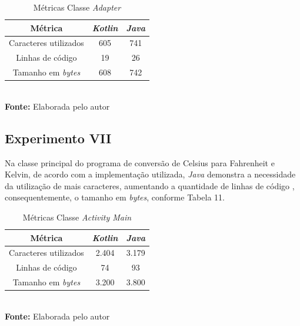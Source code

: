 \FloatBarrier
\begin{table}[!htbp]
\centering
\caption{Métricas Classe \textit{Adapter}}
	\begin{tabular}{ c | c | c }
		\hline
            \textbf{Métrica} &         \textbf{\textit{Kotlin}}    & \textbf{\textit{Java}}  \\ \hline
		
		  Caracteres utilizados   &     605 	      &          741      \\ \hline
		             
		  Linhas de código        &     19            &           26      \\ \hline
		             
		  Tamanho em \textit{bytes}        &     608           &          742      \\ \hline
		  
	\end{tabular}
	\\ \vspace{0.2cm}
	\textbf{Fonte:} Elaborada pelo autor
	\label{tab:exemplo}
\end{table}
\FloatBarrier

\subsection{Experimento VII}

Na classe principal do programa de conversão de Celsius para Fahrenheit e Kelvin, de acordo com a implementação utilizada, \textit{Java} demonstra a necessidade da utilização de mais caracteres, aumentando a quantidade de linhas de código , consequentemente, o tamanho em \textit{bytes}, conforme Tabela 11.

\FloatBarrier
\begin{table}[!htbp]
\centering
\caption{Métricas Classe \textit{Activity Main}}
	\begin{tabular}{ c | c | c }
		\hline
            \textbf{Métrica} &        \textbf{\textit{Kotlin}}    & \textbf{\textit{Java}}  \\ \hline
		
		  Caracteres utilizados   &     2.404 	      &          3.179      \\ \hline
		             
		  Linhas de código        &     74            &           93      \\ \hline
		             
		  Tamanho em \textit{bytes}        &     3.200           &          3.800      \\ \hline
		  
	\end{tabular}
	\\ \vspace{0.2cm}
	\textbf{Fonte:} Elaborada pelo autor
	\label{tab:exemplo}
\end{table}
\FloatBarrier